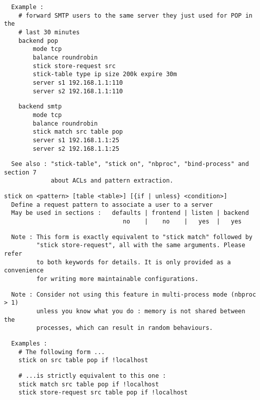 \begin{verbatim}
  Example :
    # forward SMTP users to the same server they just used for POP in the
    # last 30 minutes
    backend pop
        mode tcp
        balance roundrobin
        stick store-request src
        stick-table type ip size 200k expire 30m
        server s1 192.168.1.1:110
        server s2 192.168.1.1:110
\end{verbatim}

\begin{verbatim}
    backend smtp
        mode tcp
        balance roundrobin
        stick match src table pop
        server s1 192.168.1.1:25
        server s2 192.168.1.1:25
\end{verbatim}

\begin{verbatim}
  See also : "stick-table", "stick on", "nbproc", "bind-process" and section 7
             about ACLs and pattern extraction.
\end{verbatim}

\begin{verbatim}
stick on <pattern> [table <table>] [{if | unless} <condition>]
  Define a request pattern to associate a user to a server
  May be used in sections :   defaults | frontend | listen | backend
                                 no    |    no    |   yes  |   yes
\end{verbatim}

\begin{verbatim}
  Note : This form is exactly equivalent to "stick match" followed by
         "stick store-request", all with the same arguments. Please refer
         to both keywords for details. It is only provided as a convenience
         for writing more maintainable configurations.
\end{verbatim}

\begin{verbatim}
  Note : Consider not using this feature in multi-process mode (nbproc > 1)
         unless you know what you do : memory is not shared between the
         processes, which can result in random behaviours.
\end{verbatim}

\begin{verbatim}
  Examples :
    # The following form ...
    stick on src table pop if !localhost
\end{verbatim}

\begin{verbatim}
    # ...is strictly equivalent to this one :
    stick match src table pop if !localhost
    stick store-request src table pop if !localhost
\end{verbatim}

